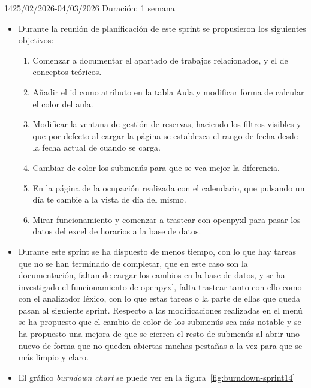 \begin{Sprint}{14}{25/02/2026-04/03/2026}
	Duración: 1 semana
	\begin{itemize}	
		\item{}
		Durante la reunión de planificación de este sprint se propusieron los siguientes objetivos:
		\begin{enumerate}
			\item Comenzar a documentar el apartado de trabajos relacionados, y el de conceptos teóricos.
			\item Añadir el id como atributo en la tabla Aula y modificar forma de calcular el color del aula.
			\item Modificar la ventana de gestión de reservas, haciendo los filtros visibles y que por defecto al cargar la página se establezca el rango de fecha desde la fecha actual de cuando se carga.
			\item Cambiar de color los submenús para que se vea mejor la diferencia.
			\item En la página de la ocupación realizada con el calendario, que pulsando un día te cambie a la vista de día del mismo.
			\item Mirar funcionamiento y comenzar a trastear con openpyxl para pasar los datos del excel de horarios a la base de datos.
		\end{enumerate}
		\item{}
		Durante este sprint se ha dispuesto de menos tiempo, con lo que hay tareas que no se han terminado de completar, que en este caso son la documentación, faltan de cargar los cambios en la base de datos, y se ha investigado el funcionamiento de openpyxl, falta trastear tanto con ello como con el analizador léxico, con lo que estas tareas o la parte de ellas que queda pasan al siguiente sprint. Respecto a las modificaciones realizadas en el menú se ha propuesto que el cambio de color de los submenús sea más notable y se ha propuesto una mejora de que se cierren el resto de submenús al abrir uno nuevo de forma que no queden abiertas muchas pestañas a la vez para que se más limpio y claro.
		
		\item{} 
		El gráfico \textit{burndown chart} se puede ver en la figura~\ref{fig:burndown-sprint14}
	\end{itemize}
\end{Sprint}

